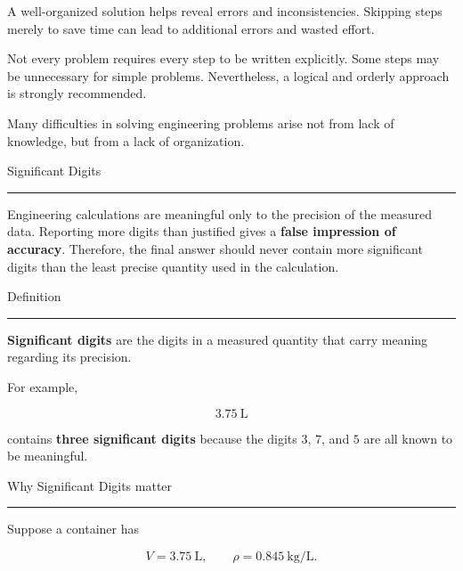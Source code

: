 \documentclass[12pt]{article}
\begin{document}
A well-organized solution helps reveal errors and inconsistencies. Skipping steps merely to save time can lead to additional errors and wasted effort.

Not every problem requires every step to be written explicitly. Some steps may be unnecessary for simple problems. Nevertheless, a logical and orderly approach is strongly recommended.

Many difficulties in solving engineering problems arise not from lack of knowledge, but from a lack of organization.

\newpage


\begin{center}
\vspace{15pt}
{\headingfont\Huge Significant Digits}
\par
\vspace{4pt}
\hrule

\end{center}


Engineering calculations are meaningful only to the precision of the measured
data. Reporting more digits than justified gives a \textbf{false impression of
accuracy}. Therefore, the final answer should never contain more significant
digits than the least precise quantity used in the calculation. 


\vspace{15pt}
{\headingfont\large Definition}
\par
\vspace{4pt}
\hrule
\vspace{10pt}

\textbf{Significant digits} are the digits in a measured quantity that carry
meaning regarding its precision.

For example,

\[
3.75~\text{L}
\]

contains \textbf{three significant digits} because the digits \(3\), \(7\), and
\(5\) are all known to be meaningful.


\vspace{15pt}
{\headingfont\large Why Significant Digits matter}
\par
\vspace{4pt}
\hrule
\vspace{10pt}
Suppose a container has

\[
V=3.75~\text{L},
\qquad
\rho=0.845~\text{kg/L}.
\]
\end{document}
